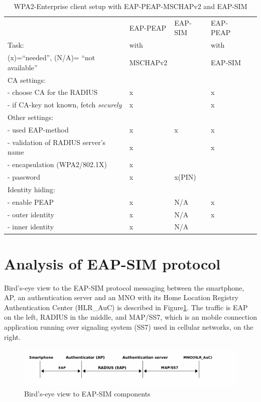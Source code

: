 \documentclass[12pt,a4paper,english]{tutthesis}
\begin{document}
\begin{otherlanguage}{english}
\begin{table}[htb]
\caption{\label{table-peapsim}WPA2-Enterprise client setup with EAP-PEAP-MSCHAPv2 and EAP-SIM}
\centering
\begin{tabular}{|l|l|l|ll|}
\hline
 & EAP-PEAP & EAP-SIM & EAP-PEAP & \\
Task: & with &  & with & \\
(x)=``needed'', (N/A)= ``not available'' & MSCHAPv2 &  & EAP-SIM & \\
\hline
CA settings: &  &  &  & \\
- choose CA for the RADIUS & x &  & x & \\
- if CA-key not known, fetch \emph{securely} & x &  & x & \\
\hline
Other settings: &  &  &  & \\
- used EAP-method & x & x & x & \\
- validation of RADIUS server's name & x &  & x & \\
- encapsulation (WPA2/802.1X) & x &  &  & \\
- password & x & x(PIN) &  & \\
\hline
Identity hiding: &  &  &  & \\
- enable PEAP & x & N/A & x & \\
- outer identity & x & N/A & x & \\
- inner identity & x & N/A &  & \\
\hline
\end{tabular}
\end{table}

\section{Analysis of EAP-SIM protocol}
\label{sec-2-6}
Bird's-eye view to the EAP-SIM protocol messaging between the
smartphone, AP, an authentication server and an MNO with its Home Location
Registry Authentication Center (HLR\_AuC) is described in
Figure\ref{fig:eap-sim-bird}.  The traffic is EAP on the left, RADIUS in the
middle, and MAP/SS7, which is an mobile connection application running
over signaling system (SS7) used in cellular networks, on the right.


\begin{figure}[htb]
\centering
\includegraphics[width=.9\linewidth]{eap-sim-bird.png}
\caption{\label{fig:eap-sim-bird}Bird's-eye view to EAP-SIM components}
\end{figure}






\end{otherlanguage}
\end{document}
